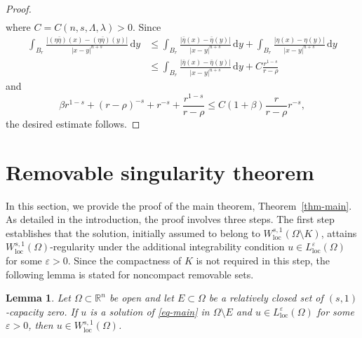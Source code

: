 \documentclass{amsart}
\theoremstyle{plain}
\newtheorem{lemma}[theorem]{Lemma}
\theoremstyle{definition}
\numberwithin{equation}{section}
\begin{document}
\begin{proof}
\begin{align*}
\end{align*}
where $C=C(n, s, \Lambda, \lambda)>0$. Since
\begin{align*}
\int_{B_r} \frac{|(\eta\bar{\eta})(x)-(\eta\bar{\eta})(y)|}{|x-y|^{n+s}} \,\mathrm{d}y
&\leq \int_{B_r} \frac{|\bar{\eta}(x)-\bar{\eta}(y)|}{|x-y|^{n+s}} \,\mathrm{d}y + \int_{B_r} \frac{|\eta(x)-\eta(y)|}{|x-y|^{n+s}} \,\mathrm{d}y \\
&\leq \int_{B_r} \frac{|\bar{\eta}(x)-\bar{\eta}(y)|}{|x-y|^{n+s}} \,\mathrm{d}y + C\frac{r^{1-s}}{r-\rho}
\end{align*}
and
\begin{equation*}
\beta r^{1-s} + (r-\rho)^{-s} + r^{-s} + \frac{r^{1-s}}{r-\rho} \leq C(1+\beta) \frac{r}{r-\rho}r^{-s},
\end{equation*}
the desired estimate follows.
\end{proof}

\section{Removable singularity theorem}\label{sec-RST}

In this section, we provide the proof of the main theorem, Theorem~\ref{thm-main}. As detailed in the introduction, the proof involves three steps. The first step establishes that the solution, initially assumed to belong to $W^{s, 1}_{\mathrm{loc}}(\Omega \setminus K)$, attains $W^{s, 1}_{\mathrm{loc}}(\Omega)$-regularity under the additional integrability condition $u \in L^\varepsilon_{\mathrm{loc}}(\Omega)$ for some $\varepsilon>0$. Since the compactness of $K$ is not required in this step, the following lemma is stated for noncompact removable sets.

\begin{lemma}\label{lem-step1}
Let $\Omega \subset \mathbb{R}^n$ be open and let $E \subset \Omega$ be a relatively closed set of $(s, 1)$-capacity zero. If $u$ is a solution of \eqref{eq-main} in $\Omega \setminus E$ and $u \in L^{\varepsilon}_{\mathrm{loc}}(\Omega)$ for some $\varepsilon > 0$, then $u \in W^{s, 1}_{\mathrm{loc}}(\Omega)$.
\end{lemma}
\end{document}
